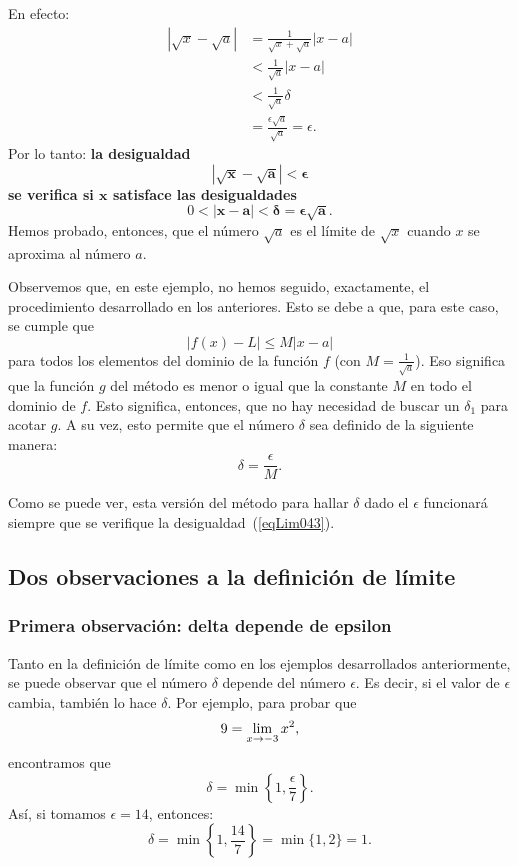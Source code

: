 \begin{exemplo}[Solución]
En efecto:
\begin{align*}
|\sqrt{x} - \sqrt{a}| &= \frac{1}{\sqrt{x} + \sqrt{a}}|x - a| \\
& < \frac{1}{\sqrt{a}}|x - a| \\
& < \frac{1}{\sqrt{a}}\delta \\
& = \frac{\epsilon\sqrt{a}}{\sqrt{a}} = \epsilon.
\end{align*}
Por lo tanto: {\bfseries la desigualdad
\[
\bm{|\sqrt{x} - \sqrt{a}| < \epsilon}
\]
se verifica si $\bm{x}$ satisface las desigualdades
\[
0 < \bm{|x - a| < \delta = \epsilon\sqrt{a}}.
\]
}
Hemos probado, entonces, que el número $\sqrt{a}$ es el límite de $\sqrt{x}$ cuando $x$ se
aproxima al número $a$.
\end{exemplo}

Observemos que, en este ejemplo, no hemos seguido, exactamente, el procedimiento desarrollado en
los anteriores. Esto se debe a que, para este caso, se cumple que
\begin{equation}
\label{eqLim043}
|f(x) - L| \leq M|x - a|
\end{equation}
para todos los elementos del dominio de la función $f$ (con $M = \frac{1}{\sqrt{a}}$). Eso
significa que la función $g$ del método es menor o igual que la constante $M$ en todo el dominio de
$f$. Esto significa, entonces, que no hay necesidad de buscar un $\delta_1$ para acotar $g$. A su
vez, esto permite que el número $\delta$ sea definido de la siguiente manera:
\[
\delta = \frac{\epsilon}{M}.
\]

Como se puede ver, esta versión del método para hallar $\delta$ dado el $\epsilon$ funcionará
siempre que se verifique la desigualdad~(\ref{eqLim043}).

\subsection{Dos observaciones a la definición de límite}
\subsubsection{Primera observación: delta depende de epsilon}
Tanto en la definición de límite como en los ejemplos desarrollados anteriormente, se puede
observar que el número $\delta$ depende del número $\epsilon$. Es decir, si el valor de $\epsilon$
cambia, también lo hace $\delta$. Por ejemplo, para probar que
\[
9 = \limjc{x^2}{x}{-3},
\]
encontramos que
\[
\delta = \min\left\{1,\frac{\epsilon}{7}\right\}.
\]
Así, si tomamos $\epsilon = 14$, entonces:
\[
\delta = \min\left\{1,\frac{14}{7}\right\} = \min\{1,2\} = 1.
\]

